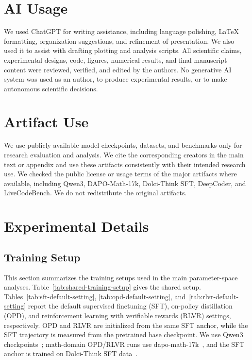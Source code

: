 \appendix

\section{AI Usage}
We used ChatGPT for writing assistance, including language polishing,
LaTeX formatting, organization suggestions, and refinement of presentation.
We also used it to assist with drafting plotting and analysis scripts.
All scientific claims, experimental designs, code, figures, numerical
results, and final manuscript content were reviewed, verified, and edited
by the authors. No generative AI system was used as an author, to produce
experimental results, or to make autonomous scientific decisions.


\section{Artifact Use}
We use publicly available model checkpoints, datasets, and benchmarks only
for research evaluation and analysis. We cite the corresponding creators in
the main text or appendix and use these artifacts consistently with their
intended research use. We checked the public license or usage terms of the
major artifacts where available, including Qwen3, DAPO-Math-17k,
Dolci-Think SFT, DeepCoder, and LiveCodeBench. We do not redistribute the
original artifacts.

\section{Experimental Details}
\label{app:experimental-details}

\subsection{Training Setup}
\label{app:training-setup}

This section summarizes the training setups used in the main
parameter-space analyses. Table~\ref{tab:shared-training-setup} gives the
shared setup. Tables~\ref{tab:sft-default-setting},
\ref{tab:opd-default-setting}, and~\ref{tab:rlvr-default-setting} report
the default supervised finetuning (SFT), on-policy distillation (OPD), and reinforcement learning with verifiable rewards (RLVR) settings, respectively. OPD and RLVR are initialized from the same SFT anchor, while the SFT trajectory is measured from the pretrained base checkpoint. We use Qwen3 checkpoints~\cite{yang2025qwen3technicalreport}; math-domain
OPD/RLVR runs use dapo-math-17k~\cite{yu2025dapoopensourcellmreinforcement},
and the SFT anchor is trained on Dolci-Think SFT data~\cite{olmo2025olmo3}.

